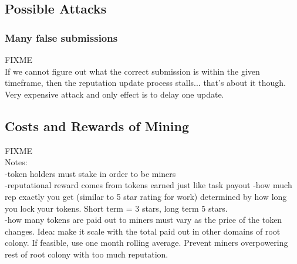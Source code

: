 \subsection{Possible Attacks}
\subsubsection*{Many false submissions}
FIXME\\ If we cannot figure out what the correct submission is within the given timeframe, then the reputation update process stalls... that's about it though. Very expensive attack and only effect is to delay one update.



\subsection{Costs and Rewards of Mining}\label{subsec:mining-costs-and-rewards}
FIXME\\
Notes:\\
-token holders must stake in order to be miners\\
-reputational reward comes from tokens earned just like task payout
-how much rep exactly you get (similar to 5 star rating for work) determined by how long you lock your tokens. Short term = 3 stars, long term 5 stars.\\
-how many tokens are paid out to miners must vary as the price of the token changes. Idea: make it scale with the total paid out in other domains of root colony. If feasible, use one month rolling average. Prevent miners overpowering rest of root colony with too much reputation.
